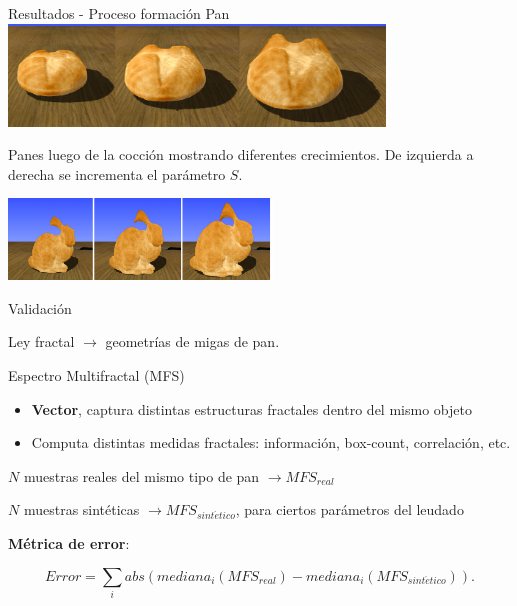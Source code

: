\documentclass[spanish,unknownkeysallowed,10pt]{beamer}
\begin{document}
\begin{frame}{Resultados - Proceso formación Pan}
\includegraphics[width=10cm]{../figures/Fig14}

Panes luego de la cocción mostrando diferentes crecimientos. De izquierda a derecha se incrementa el parámetro $S$.

\includegraphics[width=7cm]{../figures/Fig15}


\end{frame}


\begin{frame}{Validación}

Ley fractal $\rightarrow$ geometrías de migas de pan.

\begin{block}{Espectro Multifractal (MFS)}

\begin{itemize}
\item \textbf{Vector}, captura distintas estructuras fractales dentro del mismo objeto
\item Computa distintas medidas fractales: información, box-count, correlación, etc.
\end{itemize}
\end{block}

\vspace{0.2cm}

$N$ muestras reales del mismo tipo de pan $\rightarrow MFS_{real}$

$N$ muestras sintéticas $\rightarrow MFS_{sint\acute{e}tico}$, para ciertos parámetros del leudado

\vspace{0.2cm}

\textbf{Métrica de error}:

\begin{equation*}
Error = \displaystyle \sum_{i} abs(mediana_{i}(MFS_{real})-mediana_{i}(MFS_{sint\acute{e}tico})).
\end{equation*}

\end{frame}
\end{document}
